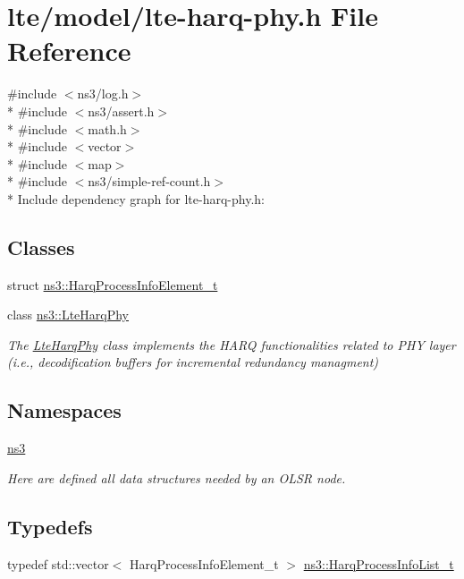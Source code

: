 \hypertarget{lte-harq-phy_8h}{}\section{lte/model/lte-\/harq-\/phy.h File Reference}
\label{lte-harq-phy_8h}
{\ttfamily \#include $<$ns3/log.\+h$>$}\\*
{\ttfamily \#include $<$ns3/assert.\+h$>$}\\*
{\ttfamily \#include $<$math.\+h$>$}\\*
{\ttfamily \#include $<$vector$>$}\\*
{\ttfamily \#include $<$map$>$}\\*
{\ttfamily \#include $<$ns3/simple-\/ref-\/count.\+h$>$}\\*
Include dependency graph for lte-\/harq-\/phy.h\+:
\subsection*{Classes}
\begin{DoxyCompactItemize}
\item 
struct \hyperlink{structns3_1_1HarqProcessInfoElement__t}{ns3\+::\+Harq\+Process\+Info\+Element\+\_\+t}
\item 
class \hyperlink{classns3_1_1LteHarqPhy}{ns3\+::\+Lte\+Harq\+Phy}
\begin{DoxyCompactList}\small\item\em The \hyperlink{classns3_1_1LteHarqPhy}{Lte\+Harq\+Phy} class implements the H\+A\+RQ functionalities related to P\+HY layer (i.\+e., decodification buffers for incremental redundancy managment) \end{DoxyCompactList}\end{DoxyCompactItemize}
\subsection*{Namespaces}
\begin{DoxyCompactItemize}
\item 
 \hyperlink{namespacens3}{ns3}
\begin{DoxyCompactList}\small\item\em Here are defined all data structures needed by an O\+L\+SR node. \end{DoxyCompactList}\end{DoxyCompactItemize}
\subsection*{Typedefs}
\begin{DoxyCompactItemize}
\item 
typedef std\+::vector$<$ Harq\+Process\+Info\+Element\+\_\+t $>$ \hyperlink{namespacens3_a8e9da9f7a4e5c0954a109b0e1dc36e40}{ns3\+::\+Harq\+Process\+Info\+List\+\_\+t}
\end{DoxyCompactItemize}
